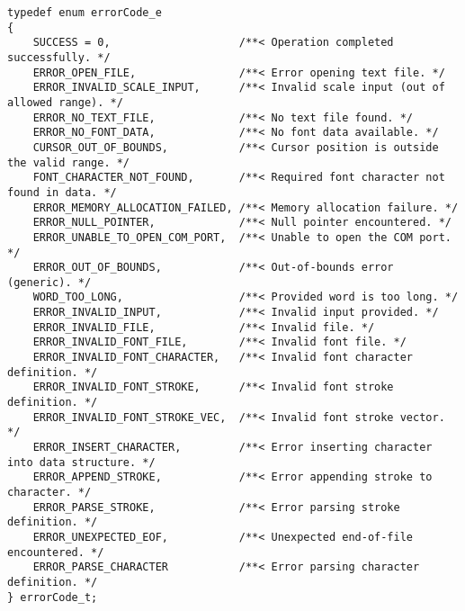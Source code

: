\begin{verbatim}
typedef enum errorCode_e
{
    SUCCESS = 0,                    /**< Operation completed successfully. */
    ERROR_OPEN_FILE,                /**< Error opening text file. */
    ERROR_INVALID_SCALE_INPUT,      /**< Invalid scale input (out of allowed range). */
    ERROR_NO_TEXT_FILE,             /**< No text file found. */
    ERROR_NO_FONT_DATA,             /**< No font data available. */
    CURSOR_OUT_OF_BOUNDS,           /**< Cursor position is outside the valid range. */
    FONT_CHARACTER_NOT_FOUND,       /**< Required font character not found in data. */
    ERROR_MEMORY_ALLOCATION_FAILED, /**< Memory allocation failure. */
    ERROR_NULL_POINTER,             /**< Null pointer encountered. */
    ERROR_UNABLE_TO_OPEN_COM_PORT,  /**< Unable to open the COM port. */
    ERROR_OUT_OF_BOUNDS,            /**< Out-of-bounds error (generic). */
    WORD_TOO_LONG,                  /**< Provided word is too long. */
    ERROR_INVALID_INPUT,            /**< Invalid input provided. */
    ERROR_INVALID_FILE,             /**< Invalid file. */
    ERROR_INVALID_FONT_FILE,        /**< Invalid font file. */
    ERROR_INVALID_FONT_CHARACTER,   /**< Invalid font character definition. */
    ERROR_INVALID_FONT_STROKE,      /**< Invalid font stroke definition. */
    ERROR_INVALID_FONT_STROKE_VEC,  /**< Invalid font stroke vector. */
    ERROR_INSERT_CHARACTER,         /**< Error inserting character into data structure. */
    ERROR_APPEND_STROKE,            /**< Error appending stroke to character. */
    ERROR_PARSE_STROKE,             /**< Error parsing stroke definition. */
    ERROR_UNEXPECTED_EOF,           /**< Unexpected end-of-file encountered. */
    ERROR_PARSE_CHARACTER           /**< Error parsing character definition. */
} errorCode_t;
    \end{verbatim}
